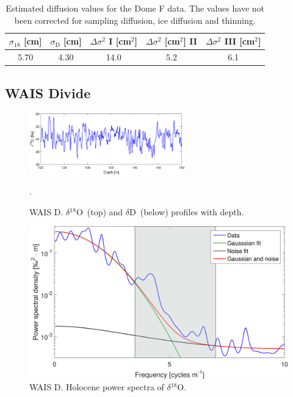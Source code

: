 \documentclass[11pt, draftcls, onecolumn]{IEEEtran} %
\numberwithin{equation}{section}
\numberwithin{table}{section}
\numberwithin{figure}{section}
\newcommand{\delOx}{$\delta{}^{18}\mathrm{O}$}
\newcommand{\delD}{$\delta\mathrm{D}$}
\begin{document}
\begin{appendices}
\begin{table}[H]
	\center
	\caption{Estimated diffusion values for the Dome F data.
		The values have not been corrected for sampling diffusion, ice diffusion and thinning.}
	\label{DomeF}
	\begin{tabular}{c c c c c} 
		\toprule
		$\sigma_{18}$ [cm] & $\sigma_\mathrm{D}$ [cm] & $\Delta\sigma^2$ I [cm$^2$] & $\Delta\sigma^2$ [cm$^2$] II & $\Delta\sigma^2$ III [cm$^2$] \\
		\midrule
		5.70 &   4.30 &    14.0 &     5.2 &     6.1 \\
		\bottomrule		
	\end{tabular}
\end{table}

\clearpage

\subsection{WAIS Divide}

\begin{figure}[H]
	\vspace*{2mm}
	\begin{center}
		\includegraphics[width=0.6\textwidth]{Figure_51}
		\caption{WAIS D. \delOx~(top) and \delD~(below) profiles with depth.}  \label{fig:WaisD_data}.
	\end{center}
\end{figure}

\begin{figure}[H]
	\vspace*{2mm}
	\begin{center}
		\includegraphics[width=.5\textwidth]{Figure_52}
		\caption{WAIS D. Holocene power spectra of \delOx.}  \label{fig:WAIS_D}
	\end{center}
\end{figure}


\end{appendices}
\end{document}
